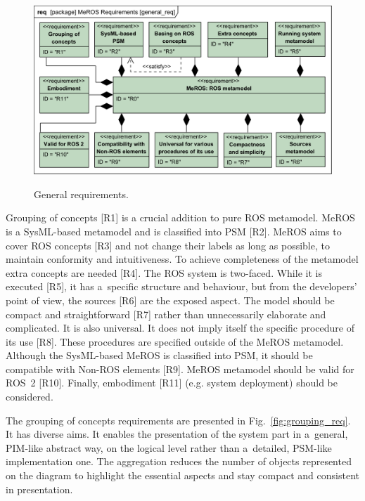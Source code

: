 \documentclass[11pt,oneside,a4paper]{report}
\begin{document}
	\begin{figure}[H]
		\centering
		\begin{center}
			{\includegraphics[scale=1.0]{diagrams/general_req.png}}
		\end{center}
		\caption{General requirements.} 
		\label{fig:general_req}
	\end{figure}
		
	Grouping of concepts [R1] is a crucial addition to pure ROS metamodel. 
	MeROS is a  SysML-based metamodel and is classified into PSM [R2].
	 MeROS aims to cover ROS concepts [R3] and not change their labels as long as possible, to maintain conformity and intuitiveness. To achieve completeness of the metamodel extra concepts are needed [R4]. The ROS system is two-faced. While it is executed [R5], it has a~specific structure and behaviour, but from the developers' point of view, the sources [R6] are the exposed aspect. The model should be compact and straightforward [R7] rather than unnecessarily elaborate and complicated. It is also universal. It does not imply itself the specific procedure of its use [R8]. These procedures are specified outside of the MeROS metamodel. Although the SysML-based MeROS is classified into PSM, it should be compatible with Non-ROS elements [R9]. MeROS metamodel should be valid for ROS~2 [R10]. Finally, embodiment [R11] (e.g. system deployment) should be considered.
	
	The grouping of concepts requirements are presented in Fig.~\ref{fig:grouping_req}. It has diverse aims. It enables the presentation of the system part in a~general, PIM-like abstract way, on the logical level rather than a~detailed, PSM-like implementation one. The aggregation reduces the number of objects represented on the diagram to highlight the essential aspects and stay compact and consistent in presentation.
	
\end{document}
